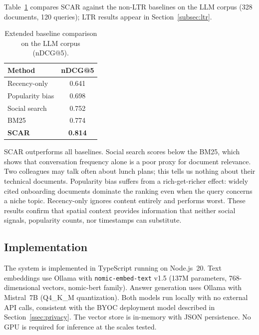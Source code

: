 \documentclass[journal]{IEEEtran}
\begin{document}
Table~\ref{tab:baseline_extended} compares SCAR against the
non-LTR baselines on the LLM corpus (328 documents, 120 queries);
LTR results appear in Section~\ref{subsec:ltr}.

\begin{table}[htbp]
\centering
\caption{Extended baseline comparison on the LLM corpus (nDCG@5).}
\label{tab:baseline_extended}
\begin{tabular}{lc}
\hline
\textbf{Method} & \textbf{nDCG@5} \\
\hline
Recency-only      & 0.641 \\
Popularity bias   & 0.698 \\
Social search     & 0.752 \\
BM25    & 0.774 \\
\textbf{SCAR}     & \textbf{0.814} \\
\hline
\end{tabular}
\end{table}

SCAR outperforms all baselines. Social search scores below the BM25,
which shows that conversation frequency alone is a poor proxy for
document relevance. Two colleagues may talk often about lunch plans;
this tells us nothing about their technical documents. Popularity
bias suffers from a rich-get-richer effect: widely cited onboarding
documents dominate the ranking even when the query concerns a niche
topic. Recency-only ignores content entirely and performs worst.
These results confirm that spatial context provides information
that neither social signals, popularity counts, nor timestamps
can substitute.

\subsection{Implementation}
\label{subsec:implementation}

The system is implemented in TypeScript running on Node.js~20. Text embeddings use Ollama with \texttt{nomic-embed-text} v1.5 (137M parameters, 768-dimensional vectors, nomic-bert family). Answer generation uses Ollama with Mistral~7B (Q4\_K\_M quantization). Both models run locally with no external API calls, consistent with the BYOC deployment model described in Section~\ref{ssec:privacy}. The vector store is in-memory with JSON persistence. No GPU is required for inference at the scales tested.

\end{document}
